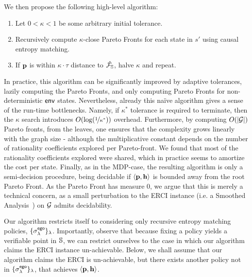 \begin{mdframed}
  We then propose the following high-level algorithm:
\begin{enumerate}
\item Let $0 < \kappa < 1$ be some arbitrary initial tolerance.
\item Recursively compute $\kappa$-close Pareto Fronts for each state
in $s'$ using causal entropy matching.
\item If $\mathbf{p}$ is within $\kappa\cdot \tau$ distance to $\hat{\mathcal{F}_{\mathbb{S}}}$,
  halve $\kappa$ and repeat.
\end{enumerate}  
\end{mdframed}
In practice, this algorithm can be significantly improved by adaptive
tolerances, lazily computing the Pareto Fronts, and only computing
Pareto Fronts for non-deterministic $\mathsf{env}$ states. Nevertheless,
already this na\"ive algorithm gives a sense of the run-time
bottlenecks. Namely, if $\kappa^*$ tolerance is required to terminate,
then the $\kappa$ search introduces $O(\log(\nicefrac{1}{\kappa^*}))$
overhead. Furthermore, by computing $O(|\mathcal{G}|)$ Pareto fronts, from the
leaves, one ensures that the complexity grows linearly with the graph
size - although the multiplicative constant depends on the number of
rationality coefficients explored per Pareto-front. We found that most
of the rationality coefficients explored were shared, which in
practice seems to amortize the cost per state. Finally, as in the
MDP-case, the resulting algorithm is only a semi-decision procedure,
being decidable if $\langle \mathbf{p}, \mathbf{h} \rangle$ is
bounded away from the root Pareto Front. As the Pareto Front has
measure 0, we argue that this is merely a technical concern, as a
small perturbation to the ERCI instance (i.e. a Smoothed
Analysis~\cite{SmoothedAnalysis}) on $\mathcal{G}$ admits decidability.

 Our algorithm restricts itself to
considering only recursive entropy matching policies,
$\{\sigma^{\mathsf{ego}}_\lambda\}_\lambda$. Importantly, observe that because
fixing a policy yields a verifiable point in $\mathbb{S}$,
we can restrict ourselves to the case in which our algorithm claims
the ERCI instance un-achievable.
Below, we shall assume that our
algorithm claims the ERCI is un-achievable, but there exists
another policy not in $\{\sigma^{\mathsf{ego}}_\lambda\}_\lambda$, that achieves
$\langle \mathbf{p}, \mathbf{h} \rangle$.


